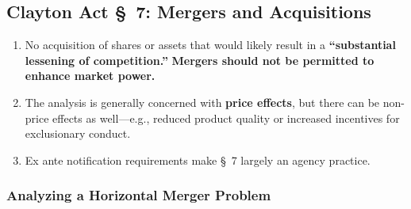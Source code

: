 \newpage

\subsection{Clayton Act \S\ 7: Mergers and Acquisitions}

\begin{enumerate}
    \item No acquisition of shares or assets that would likely result in a 
    \textbf{``substantial lessening of competition.''} \textbf{Mergers should 
    not be permitted to enhance market power.}
    \item The analysis is generally concerned with \textbf{price effects}, 
    but there can be non-price effects as well---e.g., reduced product 
    quality or increased incentives for exclusionary conduct.
    \item Ex ante notification requirements make \S\ 7 largely an agency 
    practice.
\end{enumerate}

\subsubsection{Analyzing a Horizontal Merger Problem}

